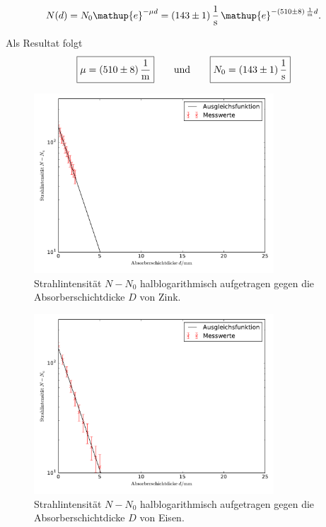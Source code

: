 \documentclass[
  bibliography=totoc,     %
  captions=tableheading,  %
  titlepage=firstiscover, %
]{scrartcl}
\begin{document}
\begin{equation}
    N(d) = N_0\mathup{e}^{-{\mu}d} = \SI{143(1)}{\frac{1}{\second}}\,\mathup{e}^{-\SI{510(8)}{\frac{1}{\metre}}d}.
    \label{eq:absorption_eisen}
\end{equation}

Als Resultat folgt
%
\begin{equation}
    \boxed{\mu = \SI{510(8)}{\frac{1}{\metre}}} \qquad\text{und}\qquad \boxed{N_0 = \SI{143(1)}{\frac{1}{\second}}}
\end{equation}

\begin{figure}[H]
    \centering
    \includegraphics[width=0.80\textwidth]{plot_Zink.pdf}
    \caption{Strahlintensität $N-N_0$ halblogarithmisch aufgetragen gegen die Absorberschichtdicke $D$ von Zink.}
    \label{fig:plot_zink}
\end{figure}

\begin{figure}[H]
    \centering
    \includegraphics[width=0.80\textwidth]{plot_Eisen.pdf}
    \caption{Strahlintensität ${N-N_0}$ halblogarithmisch aufgetragen gegen die Absorberschichtdicke $D$ von Eisen.}
    \label{fig:plot_eisen}
\end{figure}
\end{document}
